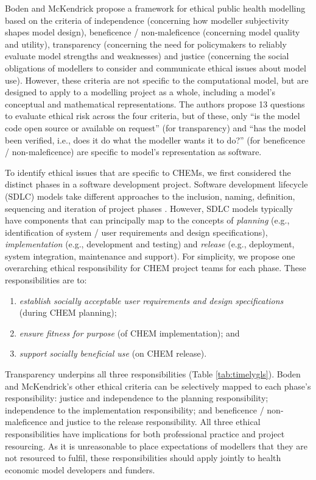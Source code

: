 \documentclass[sn-vancouver,Numbered,pdflatex]{sn-jnl}
\theoremstyle{remark}
\theoremstyle{definition}
\begin{document}
Boden and McKendrick \citep{10.3389/fpubh.2017.00068} propose a framework for ethical public health modelling based on the criteria of independence (concerning how modeller subjectivity shapes model design), beneficence / non-maleficence (concerning model quality and utility), transparency (concerning the need for policymakers to reliably evaluate model strengths and weaknesses) and justice (concerning the social obligations of modellers to consider and communicate ethical issues about model use). However, these criteria are not specific to the computational model, but are designed to apply to a modelling project as a whole, including a model's conceptual and mathematical representations. The authors propose 13 questions to evaluate ethical risk across the four criteria, but of these, only ``is the model code open source or available on request'' (for transparency) and ``has the model been verified, i.e., does it do what the modeller wants it to do?'' (for beneficence / non-maleficence) are specific to model's representation as software.

To identify ethical issues that are specific to CHEMs, we first considered the distinct phases in a software development project. Software development lifecycle (SDLC) models take different approaches to the inclusion, naming, definition, sequencing and iteration of project phases \citep{ruparelia2010software}. However, SDLC models typically have components that can principally map to the concepts of \emph{planning} (e.g., identification of system / user requirements and design specifications), \emph{implementation} (e.g., development and testing) and \emph{release} (e.g., deployment, system integration, maintenance and support). For simplicity, we propose one overarching ethical responsibility for CHEM project teams for each phase. These responsibilities are to:

\begin{enumerate}
\def\labelenumi{(\roman{enumi})}
\item
  \emph{establish socially acceptable user requirements and design specifications} (during CHEM planning);
\item
  \emph{ensure fitness for purpose} (of CHEM implementation); and
\item
  \emph{support socially beneficial use} (on CHEM release).
\end{enumerate}

Transparency underpins all three responsibilities (Table \ref{tab:timelygls}). Boden and McKendrick's other ethical criteria can be selectively mapped to each phase's responsibility: justice and independence to the planning responsibility; independence to the implementation responsibility; and beneficence / non-maleficence and justice to the release responsibility. All three ethical responsibilities have implications for both professional practice and project resourcing. As it is unreasonable to place expectations of modellers that they are not resourced to fulfil, these responsibilities should apply jointly to health economic model developers and funders.
\end{document}
